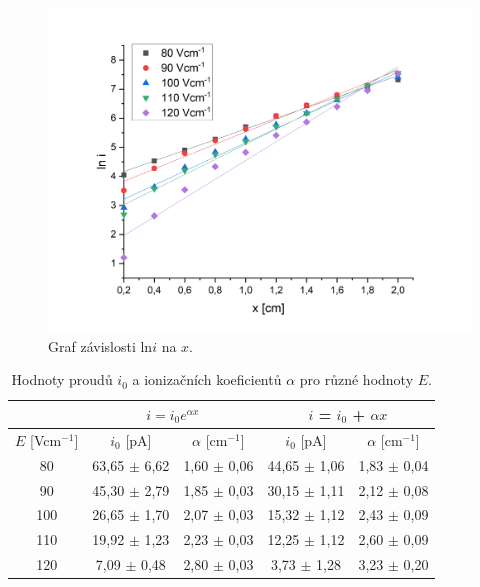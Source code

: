 \documentclass[a4paper,12pt]{article}
\begin{document}
\begin{figure}[h!]
	\centering
	\includegraphics[width=145mm]{lni.png}
	\caption{Graf závislosti ln$i$ na $x$.}
	\label{lni}
\end{figure}


\begin{center}
	\begin{table}[h]
		\centering
		\caption{Hodnoty proudů $i_0$ a ionizačních koeficientů $\alpha$ pro různé hodnoty $E$.}
		\label{tab1}
		\begin{tabular}{|c|c|c|c|c|} \hline
			\multicolumn{1}{|c|}{}  & \multicolumn{2}{c|}{$i = i_0 e^{\alpha x}$}& \multicolumn{2}{c|}{$i$ = $i_0$ + $\alpha x$}  \\ \hline
			$E$ [Vcm$^{-1}$] & $i_0$ [pA] & $\alpha$ [cm$^{-1}$] & $i_0$ [pA] & $\alpha$ [cm$^{-1}$] \\ \hline
			80 & 63,65 $\pm$ 6,62 & 1,60 $\pm$ 0,06 & 44,65 $\pm$ 1,06 & 1,83 $\pm$ 0,04\\ \hline
			90 & 45,30 $\pm$ 2,79 & 1,85 $\pm$ 0,03& 30,15 $\pm$ 1,11 & 2,12 $\pm$ 0,08\\ \hline
			100 & 26,65 $\pm$ 1,70 & 2,07 $\pm$ 0,03 & 15,32 $\pm$ 1,12 & 2,43 $\pm$ 0,09\\ \hline
			110 & 19,92 $\pm$ 1,23 & 2,23 $\pm$ 0,03 & 12,25 $\pm$ 1,12 & 2,60 $\pm$ 0,09 \\ \hline
			120 & 7,09 $\pm$ 0,48 & 2,80 $\pm$ 0,03 & 3,73 $\pm$ 1,28 & 3,23 $\pm$ 0,20 \\ \hline
			
		\end{tabular}
	\end{table}
\end{center}
\end{document}
